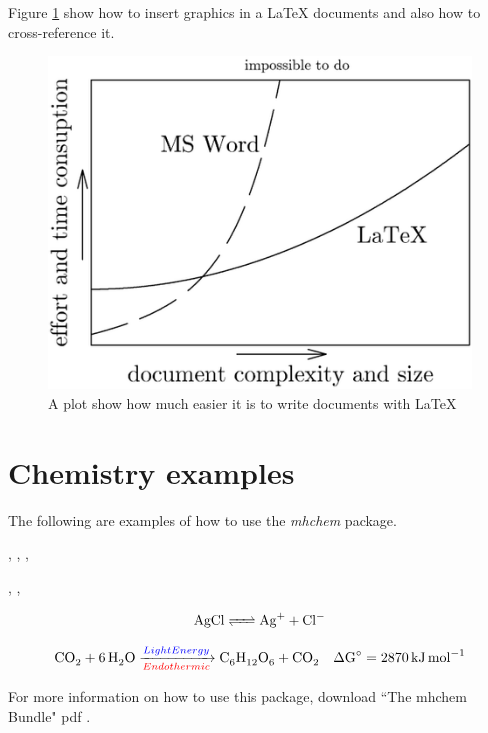 Figure \ref{fig:WordVsLatex} show how to insert graphics in a \LaTeX{} documents and also how to cross-reference it.

\begin{figure}[h!]
\centering
\includegraphics[width=0.6 \textwidth]{pics/WordVsLatex.png}
\caption{A plot show how much easier it is to write documents with \LaTeX{}} \label{fig:WordVsLatex}
\end{figure}

\chapter{Chemistry examples}

The following are examples of how to use the \textit{mhchem} package.

, , , 





, , 

\begin{equation}
\ce{AgCl <=> Ag+ + Cl-}
\end{equation}

\begin{equation}
\ce{CO2 + 6H2O ->[\textcolor{blue}{Light Energy}][\textcolor{red}{Endothermic}] C6H12O6 + CO2 \quad \Delta G^{\circ}} = \SI{+2870}{kJ.mol^{-1}}
\end{equation}

For more information on how to use this package, download ``The mhchem Bundle" pdf \cite{mchem}.

\bibliomatter



